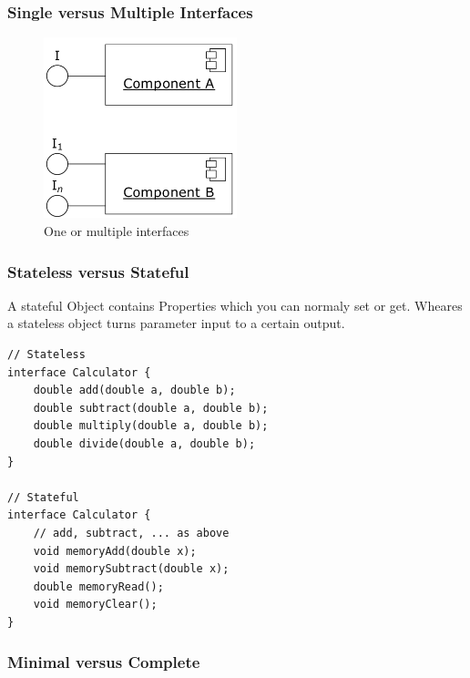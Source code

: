 \hypertarget{single-versus-multiple-interfaces}{%
\subsubsection{Single versus Multiple
Interfaces}\label{single-versus-multiple-interfaces}}

\begin{figure}[H]
\centering
\includegraphics[width=0.5\textwidth]{figures/multipleinterfaces.png}
\caption{One or multiple interfaces}
\end{figure}

\hypertarget{stateless-versus-stateful}{%
\subsubsection{Stateless versus
Stateful}\label{stateless-versus-stateful}}
A stateful Object contains Properties which you can normaly set or get. Wheares a stateless object turns parameter input to a certain output.
\begin{lstlisting}
// Stateless
interface Calculator {
    double add(double a, double b);
    double subtract(double a, double b);
    double multiply(double a, double b);
    double divide(double a, double b);
}

// Stateful
interface Calculator {
    // add, subtract, ... as above
    void memoryAdd(double x);
    void memorySubtract(double x);
    double memoryRead();
    void memoryClear();
}
\end{lstlisting}


\hypertarget{minimal-versus-complete}{%
\subsubsection{Minimal versus Complete}\label{minimal-versus-complete}}

